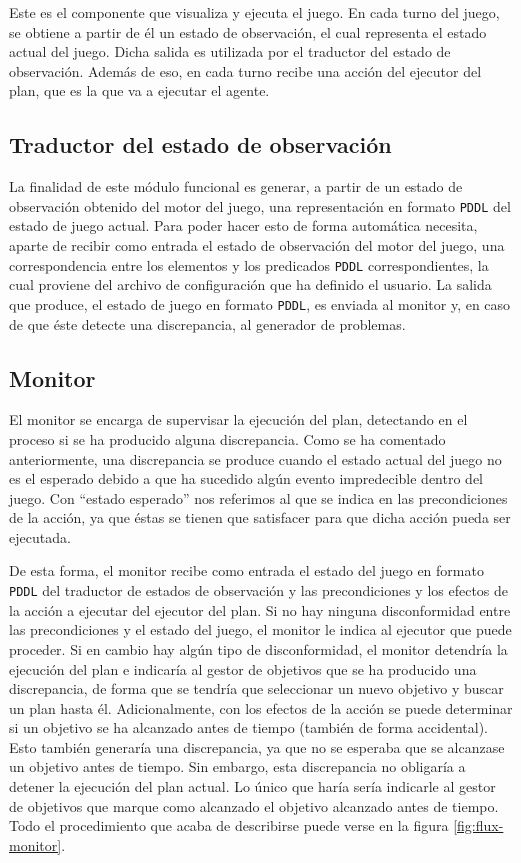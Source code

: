 Este es el componente que visualiza y ejecuta el juego. En cada turno del juego, se obtiene a partir de él un
estado de observación, el cual representa el estado actual del juego. Dicha salida es utilizada por el
traductor del estado de observación. Además de eso, en cada turno recibe una acción del ejecutor del plan,
que es la que va a ejecutar el agente.

\subsection{Traductor del estado de observación}

La finalidad de este módulo funcional es generar, a partir de un estado de observación obtenido del
motor del juego, una representación en formato \texttt{PDDL} del estado de juego actual. Para poder
hacer esto de forma automática necesita, aparte de recibir como entrada el estado de observación del
motor del juego, una correspondencia entre los elementos y los predicados \texttt{PDDL} correspondientes,
la cual proviene del archivo de configuración que ha definido el usuario. La salida que produce,
el estado de juego en formato \texttt{PDDL}, es enviada al monitor y, en caso de que éste detecte
una discrepancia, al generador de problemas.

\subsection{Monitor}

El monitor se encarga de supervisar la ejecución del plan, detectando en el proceso si se ha producido
alguna discrepancia. Como se ha comentado anteriormente, una discrepancia se produce cuando el estado
actual del juego no es el esperado debido a que ha sucedido algún evento impredecible dentro del juego.
Con ``estado esperado'' nos referimos al que se indica en las precondiciones de la acción, ya que
éstas se tienen que satisfacer para que dicha acción pueda ser ejecutada.

De esta forma, el monitor recibe como entrada el estado del juego en formato \texttt{PDDL} del
traductor de estados de observación y las precondiciones y los efectos de la acción a ejecutar
del ejecutor del plan. Si no hay ninguna disconformidad entre las precondiciones y el estado del juego,
el monitor le indica al ejecutor que puede proceder. Si en cambio hay algún tipo de disconformidad,
el monitor detendría la ejecución del plan e indicaría al gestor de objetivos que se ha producido
una discrepancia, de forma que se tendría que seleccionar un nuevo objetivo y buscar un plan hasta
él. Adicionalmente, con los efectos de la acción se puede determinar si un objetivo se ha alcanzado
antes de tiempo (también de forma accidental). Esto también generaría una discrepancia, ya que no se
esperaba que se alcanzase un objetivo antes de tiempo. Sin embargo, esta discrepancia no obligaría
a detener la ejecución del plan actual. Lo único que haría sería indicarle al gestor de objetivos
que marque como alcanzado el objetivo alcanzado antes de tiempo. Todo el procedimiento que acaba de describirse
puede verse en la figura \ref{fig:flux-monitor}.

